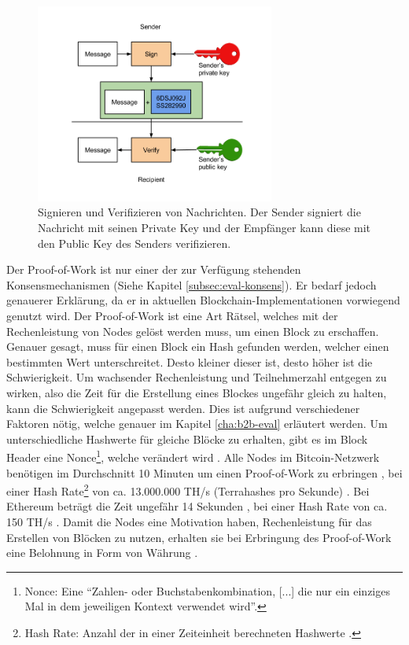 \begin{figure}[htb]
	\centering
	  \includegraphics[width=0.7\textwidth,angle=0]{images/key-signing}
	  \caption{Signieren und Verifizieren von Nachrichten. Der Sender signiert die Nachricht mit seinen Private Key und der Empfänger kann diese mit den Public Key des Senders verifizieren.}
	  \label{fig:key-signing}
\end{figure}
	

Der Proof-of-Work ist nur einer der zur Verfügung stehenden Konsensmechanismen (Siehe Kapitel \ref{subsec:eval-konsens}). Er bedarf jedoch genauerer Erklärung, da er in aktuellen Blockchain-Implementationen vorwiegend genutzt wird. Der Proof-of-Work ist eine Art Rätsel, welches mit der Rechenleistung von Nodes gelöst werden muss, um einen Block zu erschaffen. Genauer gesagt, muss für einen Block ein Hash gefunden werden, welcher einen bestimmten Wert unterschreitet. Desto kleiner dieser ist, desto höher ist die Schwierigkeit. Um wachsender Rechenleistung und Teilnehmerzahl entgegen zu wirken, also die Zeit für die Erstellung eines Blockes ungefähr gleich zu halten, kann die Schwierigkeit angepasst werden. Dies ist aufgrund verschiedener Faktoren nötig, welche genauer im Kapitel \ref{cha:b2b-eval} erläutert werden. Um unterschiedliche Hashwerte für gleiche Blöcke zu erhalten, gibt es im Block Header eine Nonce\footnote{Nonce: Eine ``Zahlen- oder Buchstabenkombination, [...] die nur ein einziges Mal in dem jeweiligen Kontext verwendet wird''\cite{Nonce2017}.}, welche verändert wird \cite{NakamotoBitcoinPeertoPeerElectronic2008}. Alle Nodes im Bitcoin-Netzwerk benötigen im Durchschnitt 10 Minuten um einen Proof-of-Work zu erbringen \cite{AntonopoulosMasteringbitcoin2015}, bei einer Hash Rate\footnote{Hash Rate: Anzahl der in einer Zeiteinheit berechneten Hashwerte \cite{GlossarBitcoin}.} von ca. 13.000.000 TH/s (Terrahashes pro Sekunde) \cite{HashRate}. Bei Ethereum beträgt die Zeit ungefähr 14 Sekunden \cite{EthereumAverageBlockTime}, bei einer Hash Rate von ca. 150 TH/s \cite{EthereumNetworkHashRate}. Damit die Nodes eine Motivation haben, Rechenleistung für das Erstellen von Blöcken zu nutzen, erhalten sie bei Erbringung des Proof-of-Work eine Belohnung in Form von Währung \cite{NakamotoBitcoinPeertoPeerElectronic2008} \cite{EthereumWhitepaper2017}. 

